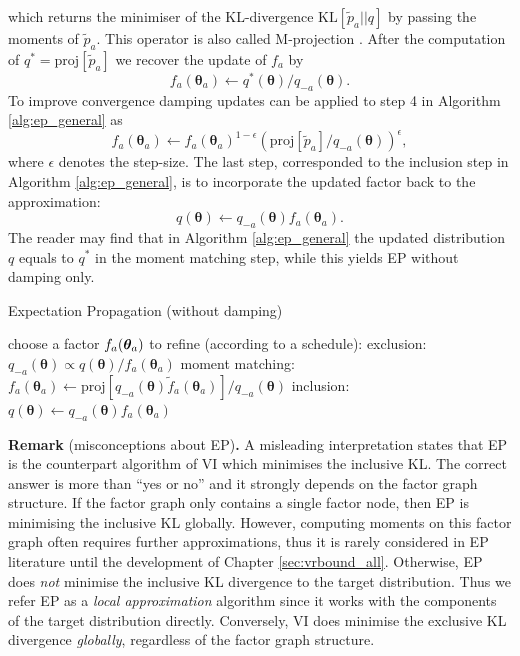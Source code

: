 which returns the minimiser of the KL-divergence $\mathrm{KL}[\tilde{p}_{a}||q]$ by passing the moments of $\tilde{p}_{a}$. This operator is also called M-projection \citep{cover:itbook1991}. After the computation of $q^* = \mathrm{proj}[\tilde{p}_a]$ we recover the update of $f_a$ by
\begin{equation}
f_a(\bm{\theta}_a) \leftarrow q^*(\bm{\theta}) / q_{-a}(\bm{\theta}).
\end{equation}
%
To improve convergence damping updates can be applied to step 4 in Algorithm \ref{alg:ep_general} as
\begin{equation}
f_a(\bm{\theta}_a) \leftarrow f_a(\bm{\theta}_{a})^{1 - \epsilon} \left(\mathrm{proj}[\tilde{p}_{a}] / q_{-a}(\bm{\theta}) \right)^{\epsilon},
\end{equation}
where $\epsilon$ denotes the step-size. The last step, corresponded to the inclusion step in Algorithm \ref{alg:ep_general}, is to incorporate the updated factor back to the approximation:
\begin{equation}
q(\bm{\theta}) \leftarrow q_{-a}(\bm{\theta}) f_a(\bm{\theta}_a).
\end{equation}
The reader may find that in Algorithm \ref{alg:ep_general} the updated distribution $q$ equals to $q^*$ in the moment matching step, while this yields EP without damping only.

%
\begin{algorithm}[t] 
\caption{Expectation Propagation (without damping)} 
\label{alg:ep_general} 
\begin{algorithmic}[1] 
	\STATE choose a factor $f_a(\bm{\theta}_a)$ to refine (according to a schedule):
	\STATE exclusion: $q_{-a}(\bm{\theta}) \propto q(\bm{\theta}) / f_a(\bm{\theta}_a)$
	\STATE moment matching: $f_a(\bm{\theta}_a) \leftarrow \mathrm{proj}[q_{-a}(\bm{\theta}) \tilde{f}_a(\bm{\theta}_a)] / q_{-a}(\bm{\theta})$
	\STATE inclusion: $q(\bm{\theta}) \leftarrow q_{-a}(\bm{\theta}) f_a(\bm{\theta}_a)$
\ENDWHILE
\end{algorithmic}
\end{algorithm}
%


\vspace{1em}
\begin{tcolorbox}
\textbf{Remark} (misconceptions about EP)\textbf{.}
A misleading interpretation states that EP is the counterpart algorithm of VI which minimises the inclusive KL. The correct answer is more than ``yes or no'' and it strongly depends on the factor graph structure.
If the factor graph only contains a single factor node, then EP is minimising the inclusive KL globally. However, computing moments on this factor graph often requires further approximations, thus it is rarely considered in EP literature until the development of Chapter \ref{sec:vrbound_all}. Otherwise, EP does \emph{not} minimise the inclusive KL divergence to the target distribution. Thus we refer EP as a \emph{local approximation} algorithm since it works with the components of the target distribution directly. Conversely, VI does minimise the exclusive KL divergence \emph{globally}, regardless of the factor graph structure.
\end{tcolorbox}

